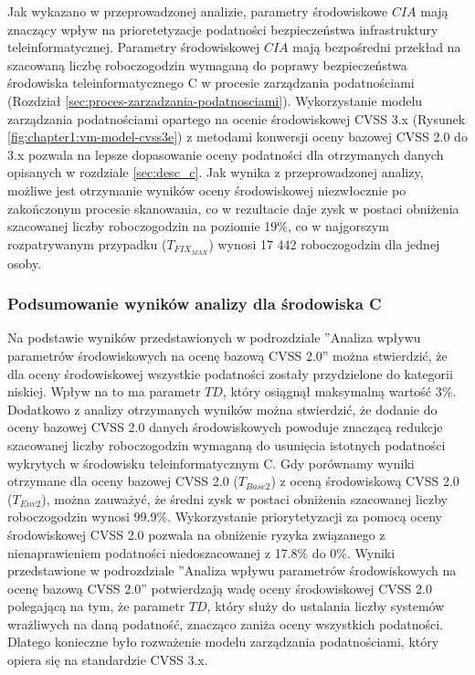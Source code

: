 \bigbreak
Jak wykazano w przeprowadzonej analizie, parametry środowiskowe $CIA$ mają znaczący wpływ na prioretetyzacje podatności bezpieczeństwa infrastruktury teleinformatycznej. Parametry środowiskowej $CIA$ mają bezpośredni przekład na szacowaną liczbę roboczogodzin wymaganą do poprawy bezpieczeństwa środowiska teleinformatycznego C w procesie zarządzania podatnościami (Rozdział \ref{sec:proces-zarzadzania-podatnosciami}). Wykorzystanie modelu zarządzania podatnościami opartego na ocenie środowiskowej CVSS 3.x (Rysunek \ref{fig:chapter1:vm-model-cvss3e}) z metodami konwersji oceny bazowej CVSS 2.0 do 3.x pozwala na lepsze dopasowanie oceny podatności dla otrzymanych danych opisanych w rozdziale \ref{sec:desc_c}. Jak wynika z przeprowadzonej analizy, możliwe jest otrzymanie wyników oceny środowiskowej niezwłocznie po zakończonym procesie skanowania, co w rezultacie daje zysk w postaci obniżenia szacowanej liczby roboczogodzin na poziomie 19\%, co w najgorszym rozpatrywanym przypadku ($T_{FIX_{MAX}}$) wynosi 17 442 roboczogodzin dla jednej osoby.


\subsubsection{Podsumowanie wyników analizy dla środowiska C}
Na podstawie wyników przedstawionych w podrozdziale ''Analiza wpływu parametrów środowiskowych na ocenę bazową CVSS 2.0'' można stwierdzić, że dla oceny środowiskowej wszystkie podatności zostały przydzielone do kategorii niskiej. Wpływ na to ma parametr $TD$, który osiągnął maksymalną wartość 3\%. Dodatkowo z analizy otrzymanych wyników można stwierdzić, że dodanie do oceny bazowej CVSS 2.0 danych środowiskowych powoduje znaczącą redukcje szacowanej liczby roboczogodzin wymaganą do usunięcia istotnych podatności wykrytych w środowisku teleinformatycznym C. Gdy porównamy wyniki otrzymane dla oceny bazowej CVSS 2.0 ($T_{Base2}$) z oceną środowiskową CVSS 2.0 ($T_{Env2}$), można zauważyć, że średni zysk w postaci obniżenia szacowanej liczby roboczogodzin wynosi 99.9\%. Wykorzystanie priorytetyzacji za pomocą oceny środowiskowej CVSS 2.0 pozwala na obniżenie ryzyka związanego z nienaprawieniem podatności niedoszacowanej z 17.8\% do 0\%. Wyniki przedstawione w podrozdziale ''Analiza wpływu parametrów środowiskowych na ocenę bazową CVSS 2.0'' potwierdzają wadę oceny środowiskowej CVSS 2.0 polegającą na tym, że parametr $TD$, który służy do ustalania liczby systemów wrażliwych na daną podatność, znacząco zaniża oceny wszystkich podatności. Dlatego konieczne było rozważenie modelu zarządzania podatnościami, który opiera się na standardzie CVSS 3.x.

